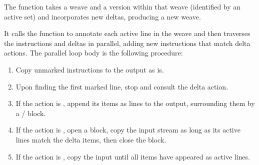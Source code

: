 \documentclass{article}
\begin{document}
The  function takes a weave
and a version within that weave (identified by an active set)
and incorporates new deltas,
producing a new weave.

It calls the  function
to annotate each active line in the weave
and then traverses the instructions and deltas in parallel,
adding new instructions that match delta actions.
The parallel loop body is the following procedure:

\begin{enumerate}
\item
  Copy unmarked instructions to the output as is.
\item
  Upon finding the first marked line,
  stop and consult the delta action.
\item
  If the action is ,
  append its items as lines to the output,
  surrounding them by a / block.
\item
  If the action is ,
  open a  block,
  copy the input stream as long as its active lines match the delta items,
  then close the block.
\item
  If the action is ,
  copy the input until all items have appeared as active lines.
\end{enumerate}
\end{document}
